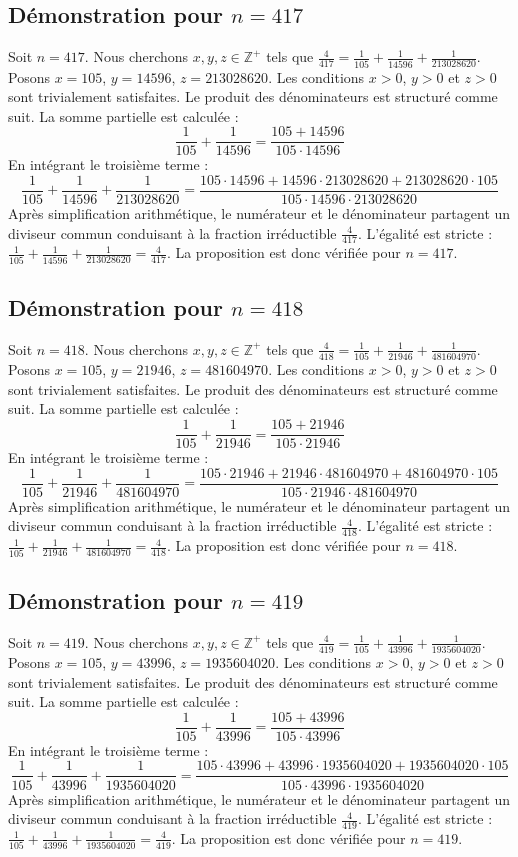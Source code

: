 \documentclass[11pt,a4paper]{article}
\begin{document}
\subsection{Démonstration pour $n = 417$}
Soit $n = 417$. Nous cherchons $x, y, z \in \mathbb{Z}^{+}$ tels que $\frac{4}{417} = \frac{1}{105} + \frac{1}{14596} + \frac{1}{213028620}$.
Posons $x = 105$, $y = 14596$, $z = 213028620$.
Les conditions $x > 0$, $y > 0$ et $z > 0$ sont trivialement satisfaites.
Le produit des dénominateurs est structuré comme suit. La somme partielle est calculée :
$$ \frac{1}{105} + \frac{1}{14596} = \frac{105+14596}{105 \cdot 14596} $$
En intégrant le troisième terme :
$$ \frac{1}{105} + \frac{1}{14596} + \frac{1}{213028620} = \frac{105 \cdot 14596 + 14596 \cdot 213028620 + 213028620 \cdot 105}{105 \cdot 14596 \cdot 213028620} $$
Après simplification arithmétique, le numérateur et le dénominateur partagent un diviseur commun conduisant à la fraction irréductible $\frac{4}{417}$.
L'égalité est stricte : $\frac{1}{105} + \frac{1}{14596} + \frac{1}{213028620} = \frac{4}{417}$.
La proposition est donc vérifiée pour $n = 417$.
\subsection{Démonstration pour $n = 418$}
Soit $n = 418$. Nous cherchons $x, y, z \in \mathbb{Z}^{+}$ tels que $\frac{4}{418} = \frac{1}{105} + \frac{1}{21946} + \frac{1}{481604970}$.
Posons $x = 105$, $y = 21946$, $z = 481604970$.
Les conditions $x > 0$, $y > 0$ et $z > 0$ sont trivialement satisfaites.
Le produit des dénominateurs est structuré comme suit. La somme partielle est calculée :
$$ \frac{1}{105} + \frac{1}{21946} = \frac{105+21946}{105 \cdot 21946} $$
En intégrant le troisième terme :
$$ \frac{1}{105} + \frac{1}{21946} + \frac{1}{481604970} = \frac{105 \cdot 21946 + 21946 \cdot 481604970 + 481604970 \cdot 105}{105 \cdot 21946 \cdot 481604970} $$
Après simplification arithmétique, le numérateur et le dénominateur partagent un diviseur commun conduisant à la fraction irréductible $\frac{4}{418}$.
L'égalité est stricte : $\frac{1}{105} + \frac{1}{21946} + \frac{1}{481604970} = \frac{4}{418}$.
La proposition est donc vérifiée pour $n = 418$.
\subsection{Démonstration pour $n = 419$}
Soit $n = 419$. Nous cherchons $x, y, z \in \mathbb{Z}^{+}$ tels que $\frac{4}{419} = \frac{1}{105} + \frac{1}{43996} + \frac{1}{1935604020}$.
Posons $x = 105$, $y = 43996$, $z = 1935604020$.
Les conditions $x > 0$, $y > 0$ et $z > 0$ sont trivialement satisfaites.
Le produit des dénominateurs est structuré comme suit. La somme partielle est calculée :
$$ \frac{1}{105} + \frac{1}{43996} = \frac{105+43996}{105 \cdot 43996} $$
En intégrant le troisième terme :
$$ \frac{1}{105} + \frac{1}{43996} + \frac{1}{1935604020} = \frac{105 \cdot 43996 + 43996 \cdot 1935604020 + 1935604020 \cdot 105}{105 \cdot 43996 \cdot 1935604020} $$
Après simplification arithmétique, le numérateur et le dénominateur partagent un diviseur commun conduisant à la fraction irréductible $\frac{4}{419}$.
L'égalité est stricte : $\frac{1}{105} + \frac{1}{43996} + \frac{1}{1935604020} = \frac{4}{419}$.
La proposition est donc vérifiée pour $n = 419$.
\end{document}
